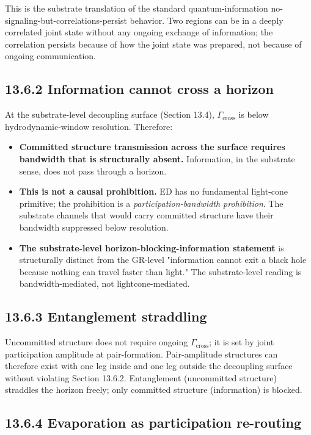 \documentclass[11pt]{book}
\begin{document}
This is the substrate translation of the standard quantum-information no-signaling-but-correlations-persist behavior. Two regions can be in a deeply correlated joint state without any ongoing exchange of information; the correlation persists because of how the joint state was prepared, not because of ongoing communication.

\subsection{13.6.2 Information cannot cross a horizon}

At the substrate-level decoupling surface (Section 13.4), $\Gamma_\mathrm{cross}$ is below hydrodynamic-window resolution. Therefore:

\begin{itemize}
\item \textbf{Committed structure transmission across the surface requires bandwidth that is structurally absent.} Information, in the substrate sense, does not pass through a horizon.
\item \textbf{This is not a causal prohibition.} ED has no fundamental light-cone primitive; the prohibition is a \textit{participation-bandwidth prohibition}. The substrate channels that would carry committed structure have their bandwidth suppressed below resolution.
\item \textbf{The substrate-level horizon-blocking-information statement} is structurally distinct from the GR-level "information cannot exit a black hole because nothing can travel faster than light." The substrate-level reading is bandwidth-mediated, not lightcone-mediated.
\end{itemize}

\subsection{13.6.3 Entanglement straddling}

Uncommitted structure does not require ongoing $\Gamma_\mathrm{cross}$; it is set by joint participation amplitude at pair-formation. Pair-amplitude structures can therefore exist with one leg inside and one leg outside the decoupling surface without violating Section 13.6.2. Entanglement (uncommitted structure) straddles the horizon freely; only committed structure (information) is blocked.

\subsection{13.6.4 Evaporation as participation re-routing}
\end{document}
